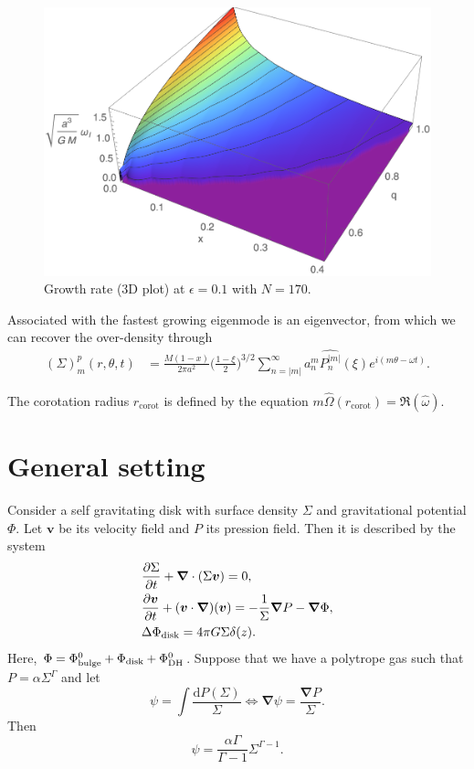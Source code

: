 \documentclass[11pt]{article}
\newcommand{\bv}{\boldsymbol{v}}
\newcommand{\bnab}{\boldsymbol{\nabla}}
\newcommand{\rd}{\mathrm{d}}
\newcommand{\Phib}{\Phi_{\rm{bulge}}}
\newcommand{\Phid}{\Phi_{\rm{disk}}}
\newcommand{\Phidh}{\Phi_{\rm{DH}}}
\newcommand{\anm}{a_n^m}
\newcommand{\Pnm}{P_n^{|m|}}
\newcommand{\hPnm}{\widehat{\Pnm}}
\newcommand{\homega}{\widehat{\omega}}
\newcommand{\hOmega}{\widehat{\Omega}}
\begin{document}
\begin{figure}
    \centering
   \includegraphics[width=0.6 \textwidth]{figs/growthRate3D_eps0_1.png}
   \caption{Growth rate (3D plot) at $\epsilon=0.1$ with $N=170$.}
   \label{fig:growthRate3D}
\end{figure}

Associated with the fastest growing eigenmode is an eigenvector, from which we can recover the over-density through
\begin{align}
(\Sigma)_m^p (r,\theta,t) &= \frac{M(1-x)}{2\pi a^2} \bigg(\frac{1-\xi}{2}\bigg)^{3/2} \sum_{n=|m|}^{\infty} \anm \hPnm(\xi) e^{i (m \theta- \omega t)} .
\end{align}

The corotation radius $r_{\mathrm{corot}}$ is defined by the equation $m \hOmega(r_{\mathrm{corot}}) = \Re(\homega)$.

\appendix

\section{General setting}

Consider a self gravitating disk with surface density $\Sigma$ and gravitational potential $\Phi$. Let $\bv$ be its velocity field and $P$ its pression field. Then it is described by the system
\begin{align}
&\frac{\partial \Sigma}{\partial t} + \bnab \cdot (\Sigma \bv) = 0 ,\\
&\frac{\partial \bv}{\partial t} + (\bv \cdot \bnab)(\bv) = -\frac{1}{\Sigma} \bnab P - \bnab \Phi ,\\
& \Delta \Phid = 4\pi G \Sigma \delta (z).
\end{align}
Here, $\Phi =\Phib^0+  \Phid +  \Phidh^0$. 
Suppose that we have a polytrope gas such that $P=\alpha \Sigma^{\Gamma}$ and let
\begin{equation}
\psi = \int \frac{\rd P(\Sigma)}{\Sigma} \Leftrightarrow \bnab \psi = \frac{\bnab P}{\Sigma}.
\end{equation}
 Then
 \begin{equation}
\psi = \frac{\alpha \Gamma}{\Gamma-1} \Sigma^{\Gamma-1}.
\end{equation}
 
\end{document}
